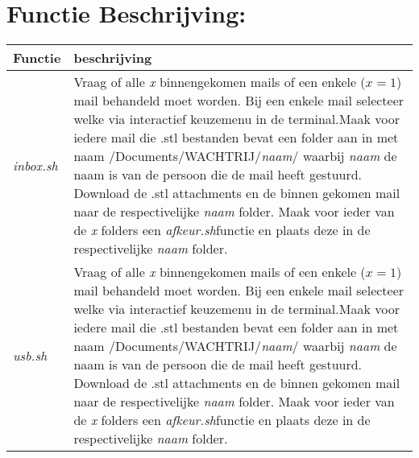 \documentclass{article}
\begin{document}
\section*{\hspace{-1cm}Functie Beschrijving:}
\begin{table}[H]
    \centering
    \begin{tabular}%
    {>{\raggedright\arraybackslash}p{}%
    |>{\raggedright\arraybackslash}p{}}
    \rowcolor{myblue}
    Functie & beschrijving\\\hline
  \textit{inbox.sh}& Vraag of alle \textit{x} binnengekomen mails of een enkele ($x=1$) mail behandeld moet worden. Bij een enkele mail selecteer welke via interactief keuzemenu in de terminal.\newline Maak voor iedere mail die .stl bestanden bevat een folder aan in met naam /Documents/WACHTRIJ/\textit{naam}/ waarbij \textit{naam} de naam is van de persoon die de mail heeft gestuurd. Download de .stl attachments en de binnen gekomen mail naar de respectivelijke \textit{naam} folder. Maak voor ieder van de \textit{x} folders een \textit{afkeur.sh}functie en plaats deze in de respectivelijke \textit{naam} folder.\\

\textit{usb.sh}& Vraag of alle \textit{x} binnengekomen mails of een enkele ($x=1$) mail behandeld moet worden. Bij een enkele mail selecteer welke via interactief keuzemenu in de terminal.\newline Maak voor iedere mail die .stl bestanden bevat een folder aan in met naam /Documents/WACHTRIJ/\textit{naam}/ waarbij \textit{naam} de naam is van de persoon die de mail heeft gestuurd. Download de .stl attachments en de binnen gekomen mail naar de respectivelijke \textit{naam} folder. Maak voor ieder van de \textit{x} folders een \textit{afkeur.sh}functie en plaats deze in de respectivelijke \textit{naam} folder.\\




\end{tabular}
\end{table}
\end{document}
